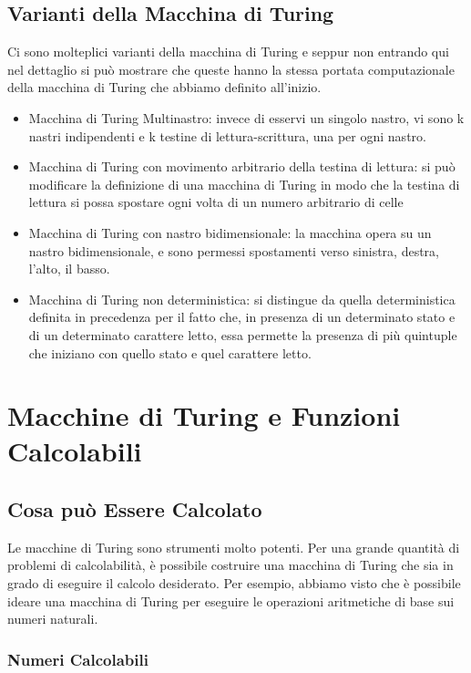 \section{Varianti della Macchina di Turing}
Ci sono molteplici varianti della macchina di Turing e seppur non
entrando qui nel dettaglio si pu\`o mostrare che queste hanno la
stessa portata computazionale della macchina di Turing che abbiamo
definito all'inizio.
\begin{itemize}
\item Macchina di Turing Multinastro: invece di esservi un singolo
  nastro, vi sono k nastri indipendenti e k testine di
  lettura-scrittura, una per ogni nastro.
\item Macchina di Turing con movimento arbitrario della testina di
  lettura: si pu\`o modificare la definizione di una macchina di
  Turing in modo che la testina di lettura si possa spostare ogni
  volta di un numero arbitrario di celle
\item Macchina di Turing con nastro bidimensionale: la macchina opera
  su un nastro bidimensionale, e sono permessi spostamenti verso
  sinistra, destra, l'alto, il basso.
\item Macchina di Turing non deterministica: si distingue da quella
  deterministica definita in precedenza per il fatto che, in presenza
  di un determinato stato e di un determinato carattere letto, essa
  permette la presenza di pi\`u quintuple che iniziano con quello
  stato e quel carattere letto.
\end{itemize}


\chapter{Macchine di Turing e Funzioni Calcolabili}

\section{Cosa pu\`o Essere Calcolato}

Le macchine di Turing sono strumenti molto potenti. Per una grande
quantit\`a di problemi di calcolabilit\`a, \`e possibile costruire una
macchina di Turing che sia in grado di eseguire il calcolo
desiderato. Per esempio, abbiamo visto che \`e possibile ideare una
macchina di Turing per eseguire le operazioni aritmetiche di base sui
numeri naturali.

\subsection{Numeri Calcolabili}

